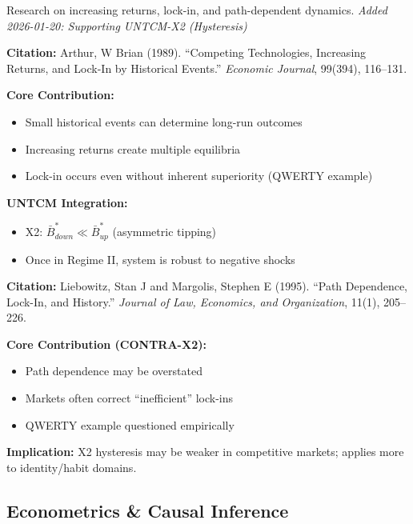Research on increasing returns, lock-in, and path-dependent dynamics.
\textit{Added 2026-01-20: Supporting UNTCM-X2 (Hysteresis)}

\begin{tcolorbox}[colback=yellow!5!white,colframe=yellow!75!black,title=Key Paper: Arthur (1989)]
\textbf{Citation:} Arthur, W Brian (1989). ``Competing Technologies, Increasing Returns, and Lock-In by Historical Events.'' \textit{Economic Journal}, 99(394), 116--131.

\textbf{Core Contribution:}
\begin{itemize}[nosep]
    \item Small historical events can determine long-run outcomes
    \item Increasing returns create multiple equilibria
    \item Lock-in occurs even without inherent superiority (QWERTY example)
\end{itemize}

\textbf{UNTCM Integration:}
\begin{itemize}[nosep]
    \item X2: $\bar{B}^*_{down} \ll \bar{B}^*_{up}$ (asymmetric tipping)
    \item Once in Regime II, system is robust to negative shocks
\end{itemize}
\end{tcolorbox}

\begin{tcolorbox}[colback=orange!5!white,colframe=orange!75!black,title=CONTRA Paper: Liebowitz \& Margolis (1995)]
\textbf{Citation:} Liebowitz, Stan J and Margolis, Stephen E (1995). ``Path Dependence, Lock-In, and History.'' \textit{Journal of Law, Economics, and Organization}, 11(1), 205--226.

\textbf{Core Contribution (CONTRA-X2):}
\begin{itemize}[nosep]
    \item Path dependence may be overstated
    \item Markets often correct ``inefficient'' lock-ins
    \item QWERTY example questioned empirically
\end{itemize}

\textbf{Implication:} X2 hysteresis may be weaker in competitive markets; applies more to identity/habit domains.
\end{tcolorbox}

\subsection{Econometrics \& Causal Inference}
\label{subsec:ot-econometrics}

